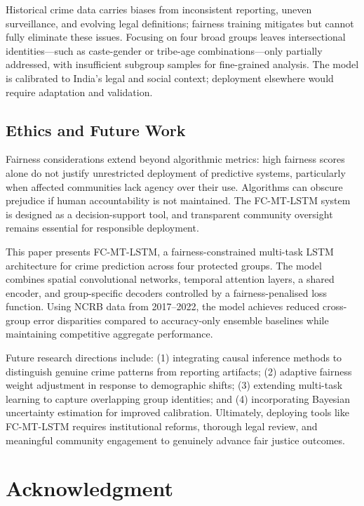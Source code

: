 \documentclass{svproc}
\newcommand{\modelname}{FC-MT-LSTM}
\begin{document}
Historical crime data carries biases from inconsistent reporting, uneven surveillance, and evolving legal definitions; fairness training mitigates but cannot fully eliminate these issues. Focusing on four broad groups leaves intersectional identities—such as caste-gender or tribe-age combinations—only partially addressed, with insufficient subgroup samples for fine-grained analysis. The model is calibrated to India's legal and social context; deployment elsewhere would require adaptation and validation.

\subsection{Ethics and Future Work}

Fairness considerations extend beyond algorithmic metrics: high fairness scores alone do not justify unrestricted deployment of predictive systems, particularly when affected communities lack agency over their use. Algorithms can obscure prejudice if human accountability is not maintained. The \modelname{} system is designed as a decision-support tool, and transparent community oversight remains essential for responsible deployment.

This paper presents \modelname{}, a fairness-constrained multi-task LSTM architecture for crime prediction across four protected groups. The model combines spatial convolutional networks, temporal attention layers, a shared encoder, and group-specific decoders controlled by a fairness-penalised loss function. Using NCRB data from 2017--2022, the model achieves reduced cross-group error disparities compared to accuracy-only ensemble baselines while maintaining competitive aggregate performance.

Future research directions include: (1) integrating causal inference methods to distinguish genuine crime patterns from reporting artifacts; (2) adaptive fairness weight adjustment in response to demographic shifts; (3) extending multi-task learning to capture overlapping group identities; and (4) incorporating Bayesian uncertainty estimation for improved calibration. Ultimately, deploying tools like \modelname{} requires institutional reforms, thorough legal review, and meaningful community engagement to genuinely advance fair justice outcomes.

\section*{Acknowledgment}
\end{document}
